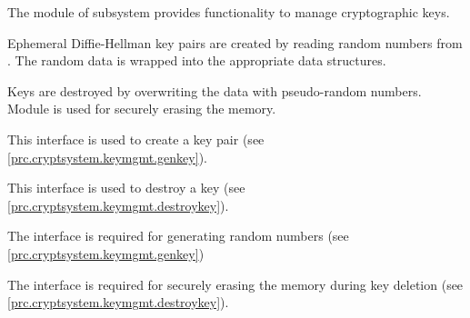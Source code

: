 



The module  of subsystem
 provides functionality to manage cryptographic keys.



Ephemeral Diffie-Hellman key pairs are created by reading random numbers from
. The random data is wrapped into the
appropriate data structures.



Keys are destroyed by overwriting the data with pseudo-random numbers. Module
 is used for securely erasing the memory.




This interface is used to create a key pair (see
\autoref{prc.cryptsystem.keymgmt.genkey}).


This interface is used to destroy a key (see \autoref{prc.cryptsystem.keymgmt.destroykey}).


The interface  is required for
generating random numbers (see \autoref{prc.cryptsystem.keymgmt.genkey})


The interface  is required for
securely erasing the memory during key deletion (see
\autoref{prc.cryptsystem.keymgmt.destroykey}).





